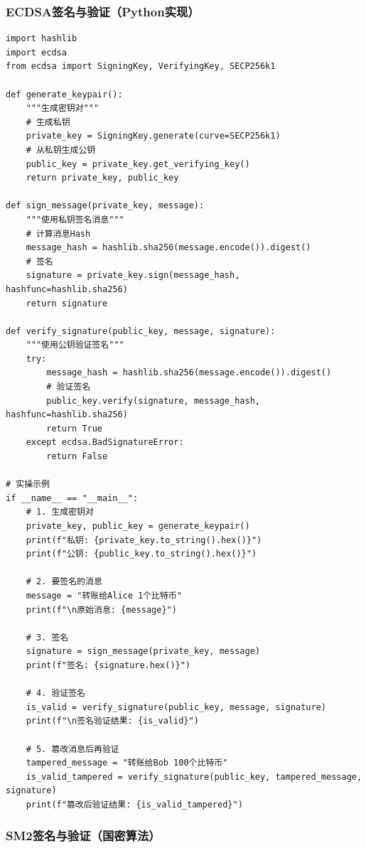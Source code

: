 ﻿\documentclass[12pt,a4paper]{article}
\begin{document}
\subsubsection{ECDSA签名与验证（Python实现）}

\begin{lstlisting}
import hashlib
import ecdsa
from ecdsa import SigningKey, VerifyingKey, SECP256k1

def generate_keypair():
    """生成密钥对"""
    # 生成私钥
    private_key = SigningKey.generate(curve=SECP256k1)
    # 从私钥生成公钥
    public_key = private_key.get_verifying_key()
    return private_key, public_key

def sign_message(private_key, message):
    """使用私钥签名消息"""
    # 计算消息Hash
    message_hash = hashlib.sha256(message.encode()).digest()
    # 签名
    signature = private_key.sign(message_hash, hashfunc=hashlib.sha256)
    return signature

def verify_signature(public_key, message, signature):
    """使用公钥验证签名"""
    try:
        message_hash = hashlib.sha256(message.encode()).digest()
        # 验证签名
        public_key.verify(signature, message_hash, hashfunc=hashlib.sha256)
        return True
    except ecdsa.BadSignatureError:
        return False

# 实操示例
if __name__ == "__main__":
    # 1. 生成密钥对
    private_key, public_key = generate_keypair()
    print(f"私钥: {private_key.to_string().hex()}")
    print(f"公钥: {public_key.to_string().hex()}")
    
    # 2. 要签名的消息
    message = "转账给Alice 1个比特币"
    print(f"\n原始消息: {message}")
    
    # 3. 签名
    signature = sign_message(private_key, message)
    print(f"签名: {signature.hex()}")
    
    # 4. 验证签名
    is_valid = verify_signature(public_key, message, signature)
    print(f"\n签名验证结果: {is_valid}")
    
    # 5. 篡改消息后再验证
    tampered_message = "转账给Bob 100个比特币"
    is_valid_tampered = verify_signature(public_key, tampered_message, signature)
    print(f"篡改后验证结果: {is_valid_tampered}")
\end{lstlisting}

\subsubsection{SM2签名与验证（国密算法）}
\end{document}
